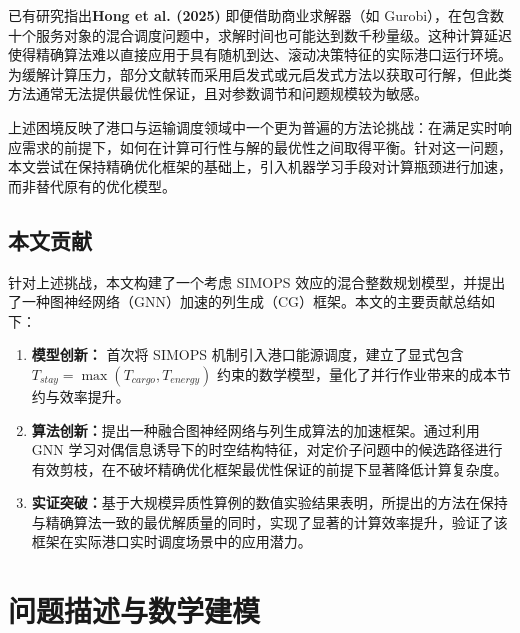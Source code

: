 \documentclass[UTF8, a4paper, 12pt]{ctexart}
\begin{document}
已有研究指出\textbf{Hong et al. (2025)} \cite{Hong2025} 即便借助商业求解器（如 Gurobi），在包含数十个服务对象的混合调度问题中，求解时间也可能达到数千秒量级。这种计算延迟使得精确算法难以直接应用于具有随机到达、滚动决策特征的实际港口运行环境。为缓解计算压力，部分文献转而采用启发式或元启发式方法以获取可行解，但此类方法通常无法提供最优性保证，且对参数调节和问题规模较为敏感。

上述困境反映了港口与运输调度领域中一个更为普遍的方法论挑战：在满足实时响应需求的前提下，如何在计算可行性与解的最优性之间取得平衡。针对这一问题，本文尝试在保持精确优化框架的基础上，引入机器学习手段对计算瓶颈进行加速，而非替代原有的优化模型。

\subsection{本文贡献}
针对上述挑战，本文构建了一个考虑 SIMOPS 效应的混合整数规划模型，并提出了一种图神经网络（GNN）加速的列生成（CG）框架。本文的主要贡献总结如下：
\begin{enumerate}
    \item \textbf{模型创新：} 首次将 SIMOPS 机制引入港口能源调度，建立了显式包含 $T_{stay} = \max(T_{cargo}, T_{energy})$ 约束的数学模型，量化了并行作业带来的成本节约与效率提升。
    \item \textbf{算法创新：}提出一种融合图神经网络与列生成算法的加速框架。通过利用 GNN 学习对偶信息诱导下的时空结构特征，对定价子问题中的候选路径进行有效剪枝，在不破坏精确优化框架最优性保证的前提下显著降低计算复杂度。
    \item \textbf{实证突破：}基于大规模异质性算例的数值实验结果表明，所提出的方法在保持与精确算法一致的最优解质量的同时，实现了显著的计算效率提升，验证了该框架在实际港口实时调度场景中的应用潜力。
\end{enumerate}



\section{问题描述与数学建模}
\label{sec:model}
\end{document}
